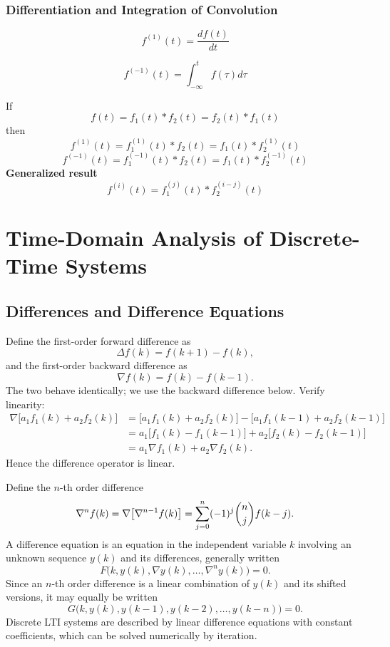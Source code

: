 \subsection{Differentiation and Integration of Convolution}
\begin{definition*}
   \[ f^{(1)}(t)=\frac{df(t)}{dt}
   \]
\end{definition*}
\begin{definition*}
   \[ f^{(-1)}(t)=\int_{-\infty}^t f(\tau)d\tau
   \]
\end{definition*}
If
\[
f(t)=f_1(t)*f_2(t)=f_2(t)*f_1(t)
\]
then
\[
    f^{(1)}(t)=f_1^{(1)}(t)*f_2(t)=f_1(t)*f_2^{(1)}(t)
\]
\[
    f^{(-1)}(t)=f_1^{(-1)}(t)*f_2(t)=f_1(t)*f_2^{(-1)}(t)
\]
\textbf{Generalized result}
\[
    f^{(i)}(t)=f_1^{(j)}(t)*f_2^{(i-j)}(t)
\]
\chapter{Time-Domain Analysis of Discrete-Time Systems}

\section{Differences and Difference Equations}

Define the first-order forward difference as
\[
    \Delta f(k)=f(k+1)-f(k),
\]
and the first-order backward difference as
\[
    \nabla f(k)=f(k)-f(k-1).
\]
The two behave identically; we use the backward difference below. Verify
linearity:
\[
\begin{aligned}
\nabla\bigl[a_1f_1(k)+a_2f_2(k)\bigr]
&= \bigl[a_1f_1(k)+a_2f_2(k)\bigr]-\bigl[a_1f_1(k-1)+a_2f_2(k-1)\bigr]\\
&= a_1\bigl[f_1(k)-f_1(k-1)\bigr]+a_2\bigl[f_2(k)-f_2(k-1)\bigr]\\
&= a_1\nabla f_1(k)+a_2\nabla f_2(k).
\end{aligned}
\]
Hence the difference operator is linear.

Define the $n$-th order difference
\[
    \nabla^{n}f(k)=\nabla\bigl[\nabla^{n-1}f(k)\bigr]
    =\sum_{j=0}^{n}(-1)^{j}\dbinom{n}{j}f(k-j).
\]
A difference equation is an equation in the independent variable $k$ involving
an unknown sequence $y(k)$ and its differences, generally written
\[
    F\bigl(k,y(k),\nabla y(k),\dots,\nabla^{n}y(k)\bigr)=0 .
\]
Since an $n$-th order difference is a linear combination of $y(k)$ and its
shifted versions, it may equally be written
\[
    G\bigl(k,y(k),y(k-1),y(k-2),\dots,y(k-n)\bigr)=0 .
\]
Discrete LTI systems are described by linear difference equations with
constant coefficients, which can be solved numerically by iteration.

